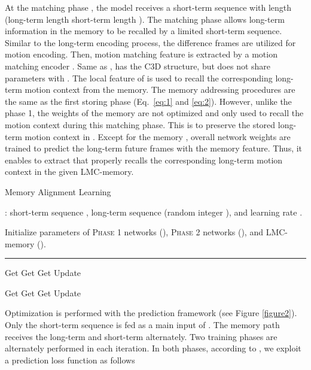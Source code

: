 \documentclass[final]{cvpr}
\begin{document}
At the matching phase , the model receives a short-term sequence  with length  (long-term length   short-term length ). The matching phase allows long-term information in the memory to be recalled by a limited short-term sequence. Similar to the long-term encoding process, the difference frames are utilized for motion encoding. Then, motion matching feature  is extracted by a motion matching encoder . Same as ,  has the C3D \cite{tran2015learning} structure, but does not share parameters with . The local feature  of  is  used to recall the corresponding long-term motion context from the memory. The memory addressing procedures are the same as the first storing phase (Eq.\ \ref{eq:1} and \ref{eq:2}). However, unlike the phase 1, the weights of the memory  are not optimized and only used to recall the motion context during this matching phase. This is to preserve the stored long-term motion context in . Except for the memory , overall network weights are trained to predict the long-term future frames with the memory feature. Thus, it enables  to extract  that properly recalls the corresponding long-term motion context in the given LMC-memory. 

\begin{algorithm}[t!]
	\caption{Memory Alignment Learning} \label{alg1}
	\begin{algorithmic}[1]
		: short-term sequence , long-term sequence  (random integer ), and learning rate .
		
		\State Initialize parameters of \textsc{Phase 1} networks (), \textsc{Phase 2} networks (), and LMC-memory (). 
		\vspace{0.05in}
		\hrule
		\vspace{0.05in}
		\State {}
		\State Get  
		\State Get  
		\For{}
		\State Get 
		\EndFor
		\State 
		\State Update
		
		\State {}
		\State Get  
		\State Get  
		\For{}
		\State Get 
		\EndFor
		\State 
		\State Update 
		
		\EndFor
	\end{algorithmic}
\end{algorithm}


Optimization is performed with the prediction framework  (see Figure \ref{figure2}). Only the short-term sequence  is fed as a main input of . The memory path receives the long-term  and short-term  alternately. Two training phases are alternately performed in each iteration. In both phases, according to \cite{wang2017predrnn, wang2018predrnn++, wang2018eidetic, su2020convolutional}, we exploit a prediction loss function   as follows
\end{document}
